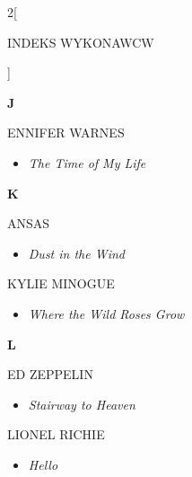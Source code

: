 \documentclass[a4paper]{report}
\begin{document}
\begin{multicols*}{2}[\begin{Huge}INDEKS WYKONAWCW\end{Huge}\vspace{1cm}]
\begin{minipage}{\columnwidth}
	\begin{Large}\textbf{J}\end{Large}ENNIFER WARNES 
	\begin{itemize}[topsep=3pt, after=\vspace{3mm}]
		\itemsep0em
		\item[]\textit{The Time of My Life}  \\
	\end{itemize}
\end{minipage}
\begin{minipage}{\columnwidth}
	\begin{Large}\textbf{K}\end{Large}ANSAS 
	\begin{itemize}[topsep=3pt, after=\vspace{3mm}]
		\itemsep0em
		\item[]\textit{Dust in the Wind}  \\
	\end{itemize}
\end{minipage}
\begin{minipage}{\columnwidth}
	KYLIE MINOGUE 
	\begin{itemize}[topsep=3pt, after=\vspace{3mm}]
		\itemsep0em
		\item[]\textit{Where the Wild Roses Grow}  \\
	\end{itemize}
\end{minipage}
\begin{minipage}{\columnwidth}
	\begin{Large}\textbf{L}\end{Large}ED ZEPPELIN 
	\begin{itemize}[topsep=3pt, after=\vspace{3mm}]
		\itemsep0em
		\item[]\textit{Stairway to Heaven}  \\
	\end{itemize}
\end{minipage}
\begin{minipage}{\columnwidth}
	LIONEL RICHIE 
	\begin{itemize}[topsep=3pt, after=\vspace{3mm}]
		\itemsep0em
		\item[]\textit{Hello}  \\
	\end{itemize}
\end{minipage}

\end{multicols*}
\end{document}
